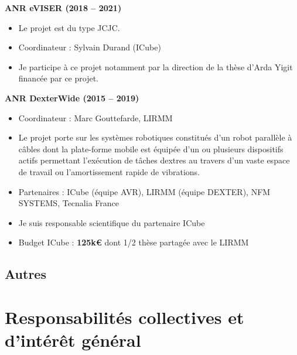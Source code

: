 \documentclass[a4paper,12pt]{article}
\newcommand{\Separation}{\noindent{\color{black!40}\rule{\textwidth}{2pt}}}
\begin{document}
\textbf{ANR eVISER (2018 -- 2021)}
\begin{itemize}
    \item Le projet est du type JCJC.
    \item Coordinateur : Sylvain Durand (ICube)
    \item Je participe à ce projet notamment par la direction de la thèse d’Arda Yigit financée par ce projet.
\end{itemize}

\textbf{ANR DexterWide (2015 -- 2019)}
\begin{itemize}
    \item Coordinateur : Marc Gouttefarde, LIRMM
    \item Le projet porte sur les systèmes robotiques constitués d’un robot parallèle à câbles dont la plate-forme mobile est équipée d’un ou plusieurs dispositifs actifs permettant l’exécution de tâches dextres au travers d’un vaste espace de travail ou l’amortissement rapide de vibrations.
    \item Partenaires : ICube (équipe AVR), LIRMM (équipe DEXTER), NFM SYSTEMS, Tecnalia France
    \item Je suis responsable scientifique du partenaire ICube
    \item Budget ICube : \textbf{125k€} dont 1/2 thèse partagée avec le LIRMM
\end{itemize}

\subsection{Autres}


\printbibliography[title={\small Bibliographie de la section << Activités scientifiques >>}]

\Separation{}


\section{Responsabilités collectives et d'intérêt général}
\end{document}
